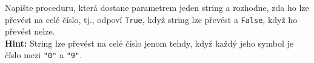\question[50]
Napište proceduru, která dostane parametrem jeden string a rozhodne, zda ho lze
převést na celé číslo, tj., odpoví \texttt{True}, když string lze převést a
\texttt{False}, když ho převést nelze.\\
\textbf{Hint:} String lze převést na celé číslo jenom tehdy, když každý jeho
symbol je číslo mezi \texttt{"0"} a \texttt{"9"}.